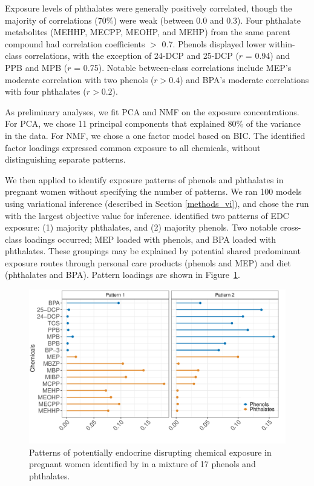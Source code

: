 Exposure levels of phthalates were generally positively correlated, though the majority of correlations (70\%) were weak (between 0.0 and 0.3). Four phthalate metabolites (MEHHP, MECPP, MEOHP, and MEHP) from the same parent compound had correlation coefficients $>$ 0.7. Phenols displayed lower within-class correlations, with the exception of 24-DCP and 25-DCP ($r$ = 0.94) and PPB and MPB ($r$ = 0.75). Notable between-class correlations include MEP's moderate correlation with two phenols ($r > 0.4$) and BPA's moderate correlations with four phthalates ($r > 0.2$).

As preliminary analyses, we fit PCA and NMF on the exposure concentrations. For PCA, we chose 11 principal components that explained 80\% of the variance in the data. For NMF, we chose a one factor model based on BIC. The identified factor loadings expressed common exposure to all chemicals, without distinguishing separate patterns.

We then applied \bnmf to identify exposure patterns of phenols and phthalates in pregnant women without specifying the number of patterns. We ran 100 models using variational inference (described in Section \ref{methods_vi}), and chose the run with the largest objective value for inference. \bnmf identified two patterns of EDC exposure: (1) majority phthalates, and (2) majority phenols. Two notable cross-class loadings occurred; MEP loaded with phenols, and BPA loaded with phthalates. These groupings may be explained by potential shared predominant exposure routes through personal care products (phenols and MEP) and diet (phthalates and BPA). Pattern loadings are shown in Figure~\ref{fig:patterns}. 

\begin{figure}[!htbp]
\caption{Patterns of potentially endocrine disrupting chemical exposure in pregnant women identified by \bnmf in a mixture of 17 phenols and phthalates.}
\label{fig:patterns}
\centering
\includegraphics[scale = 0.3]{./figures/mn2_edc_loadings_flip.pdf}
\end{figure}

